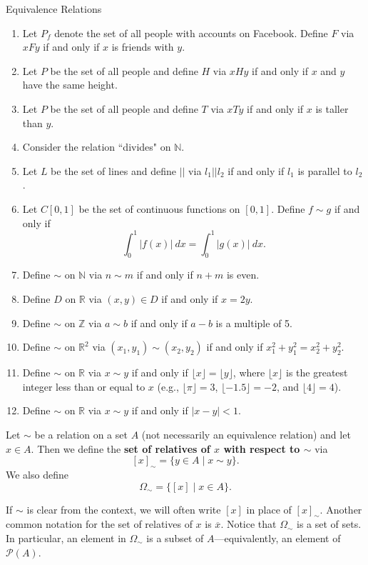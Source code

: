 \begin{section}{Equivalence Relations}
\begin{exercise}
\begin{enumerate}[label=\textrm{(\alph*)}]
\item\label{exer:facebook} Let $P_f$ denote the set of all people with accounts on Facebook.  Define  $F$ via $xFy$ if and only if $x$ is friends with $y$. 
\item Let $P$ be the set of all people and define $H$ via $xHy$ if and only if $x$ and $y$ have the same height.
\item Let $P$ be the set of all people and define $T$ via $xTy$ if and only if $x$ is taller than $y$.
\item Consider the relation ``divides" on $\mathbb{N}$.
\item Let $L$ be the set of lines and define $||$ via $l_1||l_2$ if and only if $l_1$ is parallel to $l_2$.
\item Let $C[0,1]$ be the set of continuous functions on $[0,1]$.  Define $f\sim g$ if and only if
\[
\int_0^1|f(x)|\ dx=\int_0^1|g(x)|\ dx.
\]
\item Define $\sim$ on $\mathbb{N}$ via $n\sim m$ if and only if $n+m$ is even.
\item Define $D$ on $\mathbb{R}$ via $(x,y)\in D$ if and only if $x=2y$.
\item\label{exer:mod 5} Define $\sim$ on $\mathbb{Z}$ via $a\sim b$ if and only if $a-b$ is a multiple of 5.
\item Define $\sim$ on $\mathbb{R}^2$ via $(x_1,y_1)\sim (x_2,y_2)$ if and only if $x_1^2+y_1^2=x_2^2+y_2^2$.
\item Define $\sim$ on $\mathbb{R}$ via $x\sim y$ if and only if $\lfloor x\rfloor =\lfloor y\rfloor$, where $\lfloor x\rfloor$ is the greatest integer less than or equal to $x$ (e.g., $\lfloor \pi\rfloor=3$, $\lfloor -1.5\rfloor=-2$, and $\lfloor 4\rfloor=4$).
\item Define $\sim$ on $\mathbb{R}$ via $x \sim y$ if and only if $|x-y|<1$.
\end{enumerate}
\end{exercise}

\begin{definition}\label{def:relatives}
Let $\sim$ be a relation on a set $A$ (not necessarily an equivalence relation) and let $x\in A$.  Then we define the \textbf{set of relatives of $x$ with respect to $\sim$} via
\[
[x]_{\sim}=\{y\in A\mid x\sim y\}.
\]
We also define
\[
\Omega_{\sim}=\{[x]\mid x\in A\}.
\]
\end{definition}

If $\sim$ is clear from the context, we will often write $[x]$ in place of $[x]_{\sim}$. Another common notation for the set of relatives of $x$ is $\overline{x}$. Notice that $\Omega_{\sim}$ is a set of sets.  In particular, an element in $\Omega_{\sim}$ is a subset of $A$---equivalently, an element of $\mathcal{P}(A)$.


\end{section}
